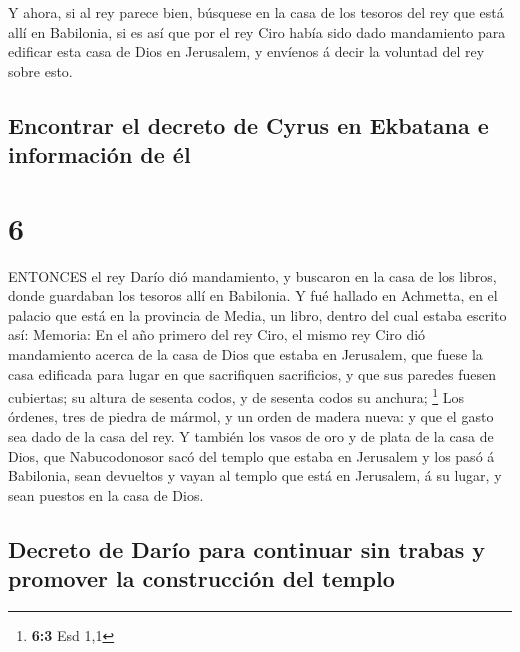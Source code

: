  Y ahora, si al rey parece bien, búsquese en la casa de los
tesoros del rey que está allí en Babilonia, si es así que por el rey
Ciro había sido dado mandamiento para edificar esta casa de Dios en
Jerusalem, y envíenos á decir la voluntad del rey sobre esto.

\hypertarget{encontrar-el-decreto-de-cyrus-en-ekbatana-e-informaciuxf3n-de-uxe9l}{%
\subsection{Encontrar el decreto de Cyrus en Ekbatana e información de
él}\label{encontrar-el-decreto-de-cyrus-en-ekbatana-e-informaciuxf3n-de-uxe9l}}

\hypertarget{section-5}{%
\section{6}\label{section-5}}

 ENTONCES el rey Darío dió mandamiento, y buscaron en la
casa de los libros, donde guardaban los tesoros allí en Babilonia.
 Y fué hallado en Achmetta, en el palacio que está en la
provincia de Media, un libro, dentro del cual estaba escrito así:
Memoria:  En el año primero del rey Ciro, el mismo rey Ciro
dió mandamiento acerca de la casa de Dios que estaba en Jerusalem, que
fuese la casa edificada para lugar en que sacrifiquen sacrificios, y que
sus paredes fuesen cubiertas; su altura de sesenta codos, y de sesenta
codos su anchura; \footnote{\textbf{6:3} Esd 1,1}  Los
órdenes, tres de piedra de mármol, y un orden de madera nueva: y que el
gasto sea dado de la casa del rey.  Y también los vasos de
oro y de plata de la casa de Dios, que Nabucodonosor sacó del templo que
estaba en Jerusalem y los pasó á Babilonia, sean devueltos y vayan al
templo que está en Jerusalem, á su lugar, y sean puestos en la casa de
Dios.

\hypertarget{decreto-de-daruxedo-para-continuar-sin-trabas-y-promover-la-construcciuxf3n-del-templo}{%
\subsection{Decreto de Darío para continuar sin trabas y promover la
construcción del
templo}\label{decreto-de-daruxedo-para-continuar-sin-trabas-y-promover-la-construcciuxf3n-del-templo}}

